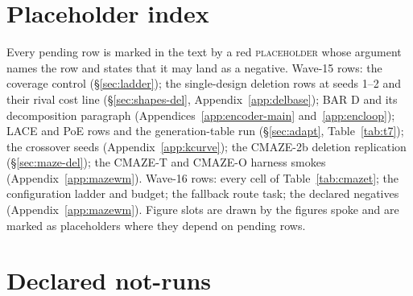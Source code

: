 \documentclass{article} %
\begin{document}
\section{Placeholder index}
\label{app:placeholders}

Every pending row is marked in the text by a red \textsc{placeholder} whose argument names the row
and states that it may land as a negative. Wave-15 rows: the coverage control %
(\S\ref{sec:ladder}); the single-design deletion rows at seeds 1--2 and their rival cost line
(\S\ref{sec:shapes-del}, Appendix~\ref{app:delbase}); BAR D and its decomposition paragraph
(Appendices~\ref{app:encoder-main} and~\ref{app:encloop}); LACE and PoE rows and the generation-table run
(\S\ref{sec:adapt}, Table~\ref{tab:t7}); the crossover seeds (Appendix~\ref{app:kcurve}); the CMAZE-2b
deletion replication (\S\ref{sec:maze-del}); the CMAZE-T and CMAZE-O harness smokes
(Appendix~\ref{app:mazewm}). Wave-16 rows: every cell of Table~\ref{tab:cmazet}; the configuration ladder and budget; the fallback route task; the declared %
negatives (Appendix~\ref{app:mazewm}). Figure slots are drawn by the figures spoke and are marked as
placeholders where they depend on pending rows.

\section{Declared not-runs}
\label{app:notrun}
\end{document}
